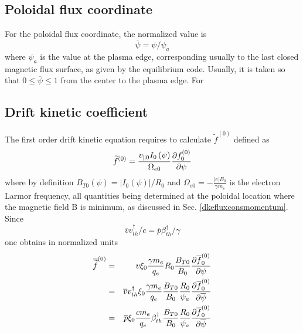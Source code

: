 \subsection{Poloidal flux coordinate}

For the poloidal flux coordinate, the normalized value is 
\begin{equation}
\overline{\psi }=\psi /\psi _{a}
\end{equation}
where $\psi _{a}$ is the value at the plasma edge, corresponding usually to
the last closed magnetic flux surface, as given by the equilibrium code.
Usually, it is taken so that $0\leq \overline{\psi }\leq 1$ from the center
to the plasma edge. For

\subsection{Drift kinetic coefficient}

The first order drift kinetic equation requires to calculate $\widetilde{f}%
^{\left( 0\right) }$ defined as 
\begin{equation}
\widetilde{f}^{\left( 0\right) }=\frac{v_{\Vert 0}I_{0}\left( \psi \right) }{%
\Omega _{e0}}\frac{\partial f_{0}^{\left( 0\right) }}{\partial \psi }
\end{equation}
where by definition $B_{T0}\left( \psi \right) =\left| I_{0}\left( \psi
\right) \right| /R_{0}$ and $\Omega _{e0}=-\frac{\left| e\right| B_{0}}{
\gamma m_{e}}$ is the electron Larmor frequency, all quantities being
determined at the poloidal location where the magnetic field B is minimum,
as discussed in Sec. \ref{dkefluxconsmomentum}. Since 
\begin{equation}
\overline{v}v_{th}^{\dag }/c=\overline{p}\beta _{th}^{\dag }/\gamma
\end{equation}
one obtains in normalized units 
\begin{eqnarray}
\overline{\widetilde{f}}^{\left( 0\right) } &=&v\xi _{0}\frac{\gamma m_{e}}{%
q_{e}}R_{0}\frac{B_{T0}}{B_{0}}\frac{\partial \overline{f}_{0}^{\left(
0\right) }}{\partial \psi }  \notag \\
&=&\overline{v}v_{th}^{\dag }\xi _{0}\frac{\gamma m_{e}}{q_{e}}\frac{B_{T0}}{%
B_{0}}\frac{R_{0}}{\psi _{a}}\frac{\partial \overline{f}_{0}^{\left(
0\right) }}{\partial \overline{\psi }}  \notag \\
&=&\overline{p}\xi _{0}\frac{cm_{e}}{q_{e}}\beta _{th}^{\dag }\frac{B_{T0}}{%
B_{0}}\frac{R_{0}}{\psi _{a}}\frac{\partial \overline{f}_{0}^{\left(
0\right) }}{\partial \overline{\psi }}
\end{eqnarray}


